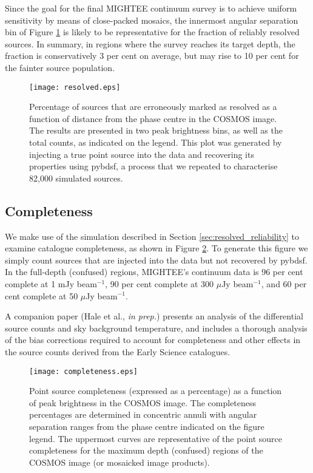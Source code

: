 \documentclass[usenatbib,usedcolumn]{mnras}
\begin{document}
Since the goal for the final MIGHTEE continuum survey is to achieve uniform sensitivity by means of close-packed mosaics, the innermost angular separation bin of Figure \ref{fig:resolved} is likely to be representative for the fraction of reliably resolved sources. In summary, in regions where the survey reaches its target depth, the fraction is conservatively 3 per cent on average, but may rise to 10 per cent for the fainter source population.

\begin{figure}
 \texttt{[image: resolved.eps]}
 \caption{Percentage of sources that are erroneously marked as resolved as a function of distance from the phase centre in the COSMOS image. The results are presented in two peak brightness bins, as well as the total counts, as indicated on the legend. This plot was generated by injecting a true point source into the data and recovering its properties using {\sc pybdsf}, a process that we repeated to characterise 82,000 simulated sources.}
 \label{fig:resolved}
\end{figure}


\subsection{Completeness}
\label{sec:completeness}

We make use of the simulation described in Section \ref{sec:resolved_reliability} to examine catalogue completeness, as shown in Figure \ref{fig:completeness}. To generate this figure we simply count sources that are injected into the data but not recovered by {\sc pybdsf}. In the full-depth (confused) regions, MIGHTEE's continuum data is 96 per cent complete at 1 mJy beam$^{-1}$, 90 per cent complete at 300 $\mu$Jy beam$^{-1}$, and 60 per cent complete at 50 $\mu$Jy beam$^{-1}$.

A companion paper (Hale et al., \emph{in prep.}) presents an analysis of the differential source counts and sky background temperature, and includes a thorough analysis of the bias corrections required to account for completeness and other effects in the source counts derived from the Early Science catalogues.

\begin{figure}
 \texttt{[image: completeness.eps]}
 \caption{Point source completeness (expressed as a percentage) as a function of peak brightness in the COSMOS image. The completeness percentages are determined in concentric annuli with angular separation ranges from the phase centre indicated on the figure legend. The uppermost curves are representative of the point source completeness for the maximum depth (confused) regions of the COSMOS image (or mosaicked image products).}
 \label{fig:completeness}
\end{figure}
\end{document}
